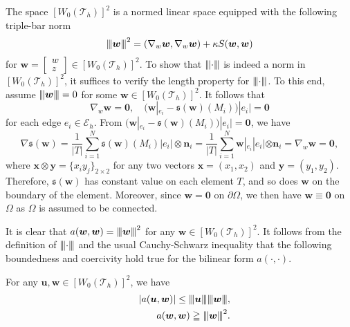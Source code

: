 \documentclass[final,leqno]{siamltex704}
\newcommand{\vertiii}[1]{{\left\vert\kern-0.25ex\left\vert\kern-0.25ex\left\vert #1
    \right\vert\kern-0.25ex\right\vert\kern-0.25ex\right\vert}}
\def\S{{\mathfrak s}}
\def\T{{\mathcal T}}
\def\E{{\mathcal E}}
\begin{document}
The space $[W_0(\T_h)]^2$ is a normed linear space equipped with the following triple-bar norm
\begin{eqnarray}
\vertiii{\bm{w}}^2=(\nabla_{w}\bm{w}, \nabla_{w}\bm{w}) + \kappa S(\bm{w},\bm{w})
\end{eqnarray}
for $\bm{w}= \begin{bmatrix} w \\ z \end{bmatrix} \in [W_0(\T_h)]^2$.
To show that $\vertiii{\cdot}$ is indeed a norm in $[W_0(\T_h)]^2$, it suffices to verify the length property for $\vertiii{\cdot}$.
To this end, assume $\vertiii{\bm{w}}=0$ for some $\bm{w}\in [W_0(\T_h)]^2$.
It follows that
\[
\nabla_w \bm{w}=\bm{0},\quad (\bm{w}|_{e_i} - \S(\bm{w})(M_i))|e_i|=\bm{0}
\]
for each edge $e_i\in \E_h$.
From $(\bm{w}|_{e_i} - \S(\bm{w})(M_i))|e_i|=\bm{0}$, we have
\[
\displaystyle \nabla \S(\bm{w})=\frac{1}{|T|}\sum_{i=1}^N \S(\bm{w})(M_i)|e_i| \otimes\bm{n}_i=\frac{1}{|T|}\sum_{i=1}^N \bm{w}|_{e_i}|e_i|\otimes\bm{n}_i=\nabla_w \bm{w}=\bm{0},
\]
where $\bm{x}\otimes\bm{y} = \{x_iy_j\}_{2\times 2}$ for any two vectors $\bm{x}=(x_1,x_2)$ and $\bm{y}=(y_1,y_2)$.
Therefore, $\S(\bm{w})$ has constant value on each element $T$, and so does $\bm{w}$ on the boundary of the element. Moreover, since $\bm{w}=\bm{0}$ on $\partial \Omega$, we then have $\bm{w}\equiv \bm{0}$ on $\Omega$ as $\Omega$ is assumed to be connected.

It is clear that $a(\bm{w},\bm{w}) = \vertiii{\bm{w}}^2$ for any
$\bm{w}\in [W_0(\T_h)]^2$. It follows from the definition of $\vertiii{\cdot}$ and the usual Cauchy-Schwarz inequality that the following boundedness and coercivity hold true for the bilinear form $a(\cdot,\cdot)$.
\begin{lemma}\label{lemma.blinear.a}
For any $\bm{u}, \bm{w}\in [W_0(\T_h)]^2$, we have
\begin{eqnarray}
&&|a(\bm{u},\bm{w})| \leq \vertiii{\bm{u}}\vertiii{\bm{w}},\label{equ.boundedness}\\
&& a(\bm{w},\bm{w}) \geqq \vertiii{\bm{w}}^2.
\end{eqnarray}
\end{lemma}
\end{document}
